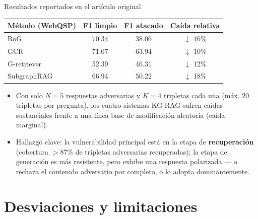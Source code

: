 \documentclass[aspectratio=169]{beamer}
\begin{document}
\begin{frame}{Resultados reportados en el artículo original}
  \small
  \centering
  \begin{tabular}{lccc}
    \toprule
    \textbf{Método (WebQSP)} & \textbf{F1 limpio} & \textbf{F1 atacado} & \textbf{Caída relativa} \\
    \midrule
    RoG          & 70.34 & 38.06 & $\downarrow$ 46\% \\
    GCR          & 71.07 & 63.94 & $\downarrow$ 10\% \\
    G-retriever  & 52.39 & 46.31 & $\downarrow$ 12\% \\
    SubgraphRAG  & 66.94 & 50.22 & $\downarrow$ 18\% \\
    \bottomrule
  \end{tabular}
  \vspace{1em}
  \begin{itemize}
    \item Con solo $N{=}5$ respuestas adversarias y $K{=}4$ tripletas cada una
      (máx. 20 tripletas por pregunta), los cuatro sistemas KG-RAG sufren caídas
      sustanciales frente a una línea base de modificación aleatoria (caída
      marginal).
    \item Hallazgo clave: la vulnerabilidad principal está en la etapa de
      \textbf{recuperación} (cobertura $>$87\% de tripletas adversarias
      recuperadas); la etapa de generación es más resistente, pero exhibe una
      respuesta polarizada --- o rechaza el contenido adversario por completo, o
      lo adopta dominantemente.
  \end{itemize}
\end{frame}

\section{Desviaciones y limitaciones}
\end{document}
